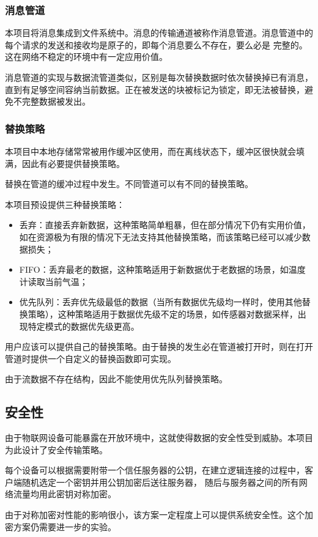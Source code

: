 \documentclass{ctexart}
\begin{document}
\subsubsection{消息管道}
\label{design-message}
本项目将消息集成到文件系统中。消息的传输通道被称作消息管道。消息管道中的每个请求的发送和接收均是原子的，即每个消息要么不存在，要么必是
完整的。这在网络不稳定的环境中有一定应用价值。

消息管道的实现与数据流管道类似，区别是每次替换数据时依次替换掉已有消息，直到有足够空间容纳当前数据。正在被发送的块被标记为锁定，即无法被替换，避免不完整数据被发出。

\subsubsection{替换策略}
\label{design-replace}
本项目中本地存储常常被用作缓冲区使用，而在离线状态下，缓冲区很快就会填满，因此有必要提供替换策略。

替换在管道的缓冲过程中发生。不同管道可以有不同的替换策略。

本项目预设提供三种替换策略：
\begin{itemize}
	\item 丢弃：直接丢弃新数据，这种策略简单粗暴，但在部分情况下仍有实用价值，如在资源极为有限的情况下无法支持其他替换策略，而该策略已经可以减少数据损失；
	\item FIFO：丢弃最老的数据，这种策略适用于新数据优于老数据的场景，如温度计读取当前气温；
	\item 优先队列：丢弃优先级最低的数据（当所有数据优先级均一样时，使用其他替换策略），这种策略适用于数据优先级不定的场景，如传感器对数据采样，出现特定模式的数据优先级更高。
\end{itemize}
用户应该可以提供自己的替换策略。由于替换的发生必在管道被打开时，则在打开管道时提供一个自定义的替换函数即可实现。

由于流数据不存在结构，因此不能使用优先队列替换策略。

\subsection{安全性}
\label{design-security}
由于物联网设备可能暴露在开放环境中，这就使得数据的安全性受到威胁。本项目为此设计了安全传输策略。

每个设备可以根据需要附带一个信任服务器的公钥，在建立逻辑连接的过程中，客户端随机选定一个密钥并用公钥加密后送往服务器，
随后与服务器之间的所有网络流量均用此密钥对称加密。

由于对称加密对性能的影响很小，该方案一定程度上可以提供系统安全性。这个加密方案仍需要进一步的实验。
\end{document}
